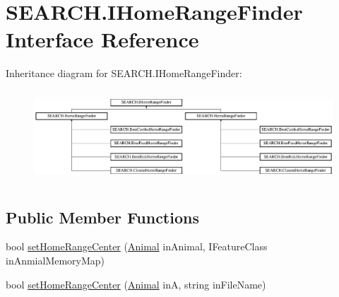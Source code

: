 \hypertarget{interface_s_e_a_r_c_h_1_1_i_home_range_finder}{\section{S\-E\-A\-R\-C\-H.\-I\-Home\-Range\-Finder Interface Reference}
\label{interface_s_e_a_r_c_h_1_1_i_home_range_finder}
}
Inheritance diagram for S\-E\-A\-R\-C\-H.\-I\-Home\-Range\-Finder\-:\begin{figure}[H]
\begin{center}
\leavevmode
\includegraphics[height=3.456790cm]{interface_s_e_a_r_c_h_1_1_i_home_range_finder}
\end{center}
\end{figure}
\subsection*{Public Member Functions}
\begin{DoxyCompactItemize}
\item 
bool \hyperlink{interface_s_e_a_r_c_h_1_1_i_home_range_finder_aa22561856b66e114de8658a2b30bdb40}{set\-Home\-Range\-Center} (\hyperlink{class_s_e_a_r_c_h_1_1_animal}{Animal} in\-Animal, I\-Feature\-Class in\-Anmial\-Memory\-Map)
\item 
bool \hyperlink{interface_s_e_a_r_c_h_1_1_i_home_range_finder_a826e9e604bb2f25077d4896464f225a1}{set\-Home\-Range\-Center} (\hyperlink{class_s_e_a_r_c_h_1_1_animal}{Animal} in\-A, string in\-File\-Name)
\end{DoxyCompactItemize}


